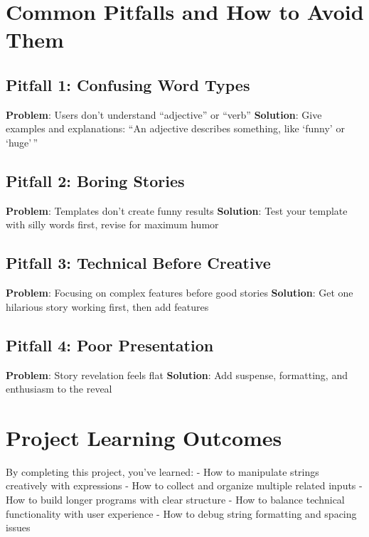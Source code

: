 \documentclass[
  letterpaper,
  DIV=11,
  numbers=noendperiod,
  oneside]{scrreprt}
\begin{document}
\section{Common Pitfalls and How to Avoid
Them}\label{common-pitfalls-and-how-to-avoid-them-1}

\subsection{Pitfall 1: Confusing Word
Types}\label{pitfall-1-confusing-word-types}

\textbf{Problem}: Users don't understand ``adjective'' or ``verb''
\textbf{Solution}: Give examples and explanations: ``An adjective
describes something, like `funny' or `huge'\,''

\subsection{Pitfall 2: Boring Stories}\label{pitfall-2-boring-stories}

\textbf{Problem}: Templates don't create funny results
\textbf{Solution}: Test your template with silly words first, revise for
maximum humor

\subsection{Pitfall 3: Technical Before
Creative}\label{pitfall-3-technical-before-creative}

\textbf{Problem}: Focusing on complex features before good stories
\textbf{Solution}: Get one hilarious story working first, then add
features

\subsection{Pitfall 4: Poor
Presentation}\label{pitfall-4-poor-presentation}

\textbf{Problem}: Story revelation feels flat \textbf{Solution}: Add
suspense, formatting, and enthusiasm to the reveal

\section{Project Learning Outcomes}\label{project-learning-outcomes-1}

By completing this project, you've learned: - How to manipulate strings
creatively with expressions - How to collect and organize multiple
related inputs - How to build longer programs with clear structure - How
to balance technical functionality with user experience - How to debug
string formatting and spacing issues
\end{document}
